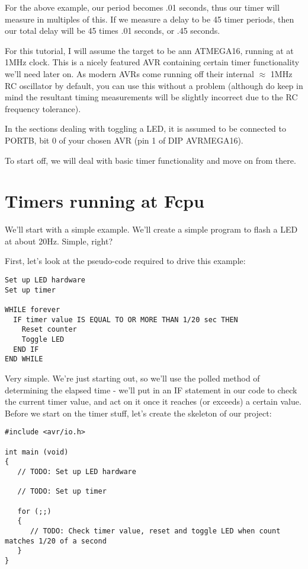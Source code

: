 \documentclass[a4paper,oneside,notitlepage]{book}
\begin{document}
For the above example, our period becomes .01 seconds, thus our timer will measure in multiples of this. If we measure a delay to be 45 timer periods, then our total delay will be 45 times .01 seconds, or .45 seconds.

For this tutorial, I will assume the target to be ann ATMEGA16, running at at 1MHz clock. This is a nicely featured AVR containing certain timer functionality we'll need later on. As modern AVRs come running off their internal \(\approx\) 1MHz RC oscillator by default, you can use this without a problem (although do keep in mind the resultant timing measurements will be slightly incorrect due to the RC frequency tolerance).

In the sections dealing with toggling a LED, it is assumed to be connected to PORTB, bit 0 of your chosen AVR (pin 1 of DIP AVRMEGA16).

To start off, we will deal with basic timer functionality and move on from there. 

\label{chp:TimersFcpu}
\chapter{Timers running at Fcpu}

We'll start with a simple example. We'll create a simple program to flash a LED at about 20Hz. Simple, right?

First, let's look at the pseudo-code required to drive this example:

\begin{center}
\begin{lstlisting}[keywordstyle=\color{black},commentstyle=\color{black}]
Set up LED hardware
Set up timer

WHILE forever
  IF timer value IS EQUAL TO OR MORE THAN 1/20 sec THEN
    Reset counter
    Toggle LED
  END IF
END WHILE
\end{lstlisting}
\end{center}


Very simple. We're just starting out, so we'll use the polled method of determining the elapsed time - we'll put in an IF statement in our code to check the current timer value, and act on it once it reaches (or exceeds) a certain value. Before we start on the timer stuff, let's create the skeleton of our project: 

\begin{center}
\begin{lstlisting}
#include <avr/io.h>

int main (void)
{
   // TODO: Set up LED hardware

   // TODO: Set up timer

   for (;;)
   {
      // TODO: Check timer value, reset and toggle LED when count matches 1/20 of a second
   }
} 
\end{lstlisting}
\end{center}
\end{document}
